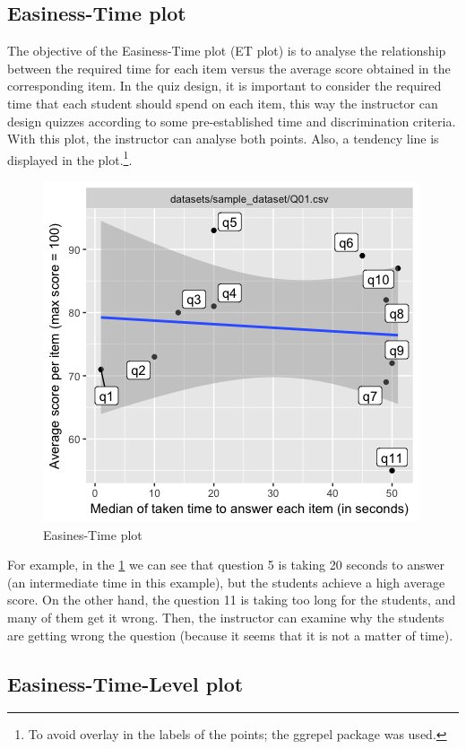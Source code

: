\subsection{Easiness-Time plot}

The objective of the Easiness-Time plot (ET plot) is to analyse the relationship between the required time for each item versus the average score obtained in the corresponding item. In the quiz design, it is important to consider the required time that each student should spend on each item, this way the instructor can design quizzes according to some pre-established time and discrimination criteria. With this plot, the instructor can analyse both points. Also, a tendency line is displayed in the plot.\footnote{To avoid overlay in the labels of the points; the ggrepel package was used.}.

\begin{figure}[ht!]
  \centering
  \includegraphics[width=.75\linewidth]{img/quiz_et.png}
  \caption{Easines-Time plot}
  \label{img:quiz_et}
\end{figure}

For example, in the \cref{img:quiz_et} we can see that question 5 is taking 20 seconds to answer (an intermediate time in this example), but the students achieve a high average score. On the other hand, the question 11 is taking too long for the students, and many of them get it wrong. Then, the instructor can examine why the students are getting wrong the question (because it seems that it is not a matter of time).

\subsection{Easiness-Time-Level plot}

